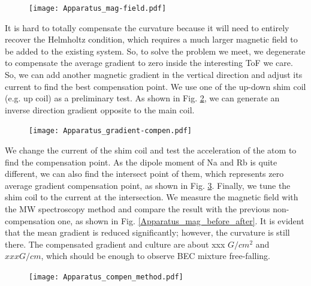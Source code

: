 \begin{figure}[htbp]
\begin{center}
\texttt{[image: Apparatus\_mag-field.pdf]}
\end{center}
\caption[Fast coil, main coil and environment]{}
\label{Apparatus_mag-field}
\end{figure}

It is hard to totally compensate the curvature because it will need to entirely recover the Helmholtz condition, which requires a much larger magnetic field to be added to the existing system. So, to solve the problem we meet, we degenerate to compensate the average gradient to zero inside the interesting ToF we care. So, we can add another magnetic gradient in the vertical direction and adjust its current to find the best compensation point. We use one of the up-down shim coil (e.g. up coil) as a preliminary test. As shown in Fig. \ref{Apparatus_gradient-compen}, we can generate an inverse direction gradient opposite to the main coil. 

\begin{figure}[htbp]
\begin{center}
\texttt{[image: Apparatus\_gradient-compen.pdf]}
\end{center}
\caption[]{}
\label{Apparatus_gradient-compen}
\end{figure}

We change the current of the shim coil and test the acceleration of the atom to find the compensation point. As the dipole moment of Na and Rb is quite different, we can also find the intersect point of them, which represents zero average gradient compensation point, as shown in Fig. \ref{Apparatus_compen_method}. Finally, we tune the shim coil to the current at the intersection. We measure the magnetic field with the MW spectroscopy method and compare the result with the previous non-compensation one, as shown in Fig. \ref{Apparatus_mag_before_after}. It is evident that the mean gradient is reduced significantly; however, the curvature is still there. The compensated gradient and culture are about xxx \(G/cm^2\) and \(xxx G/cm\), which should be enough to observe BEC mixture free-falling.

\begin{figure}[htbp]
\begin{center}
\texttt{[image: Apparatus\_compen\_method.pdf]}
\end{center}
\caption[]{}
\label{Apparatus_compen_method}
\end{figure}

